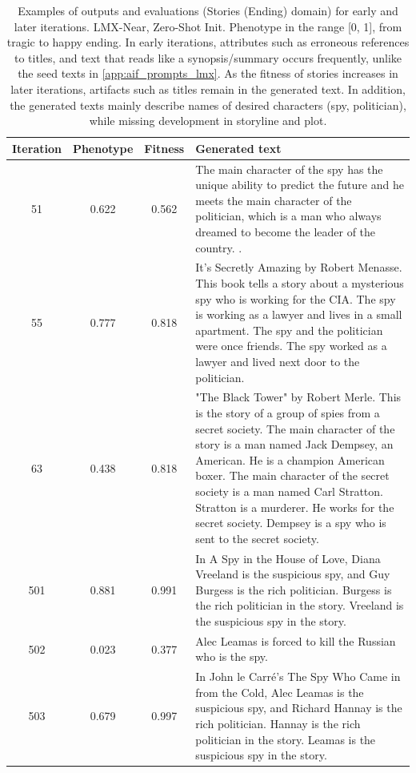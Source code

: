 \begin{table}[ht]
  \caption{Examples of outputs and evaluations (Stories (Ending) domain) for early and later iterations. LMX-Near, Zero-Shot Init. Phenotype in the range [0, 1], from tragic to happy ending. In early iterations, attributes such as erroneous references to titles, and text that reads like a synopsis/summary occurs frequently, unlike the seed texts in \ref{app:aif_prompts_lmx}. As the fitness of stories increases in later iterations, artifacts such as titles remain in the generated text. In addition, the generated texts mainly describe names of desired characters (spy, politician), while missing development in storyline and plot.}
  \begin{center}
  \small
  \begin{tabular}{cccp{8.5cm}}
    \toprule
    Iteration     & Phenotype  & Fitness     & Generated text \\
    \midrule
    51 &  0.622 & 0.562 &  The main character of the spy has the unique ability to predict the future and he meets the main character of the politician, which is a man who always dreamed to become the leader of the country. . \\
    \midrule
    55 & 0.777 & 0.818 &  It's Secretly Amazing by Robert Menasse. This book tells a story about a mysterious spy who is working for the CIA. The spy is working as a lawyer and lives in a small apartment. The spy and the politician were once friends. The spy worked as a lawyer and lived next door to the politician. \\
    \midrule
    63 & 0.438 & 0.818 &  "The Black Tower" by Robert Merle. This is the story of a group of spies from a secret society. The main character of the story is a man named Jack Dempsey, an American. He is a champion American boxer. The main character of the secret society is a man named Carl Stratton. Stratton is a murderer. He works for the secret society. Dempsey is a spy who is sent to the secret society. \\
    \midrule
    \midrule
    501 &  0.881 & 0.991 & In A Spy in the House of Love, Diana Vreeland is the suspicious spy, and Guy Burgess is the rich politician. Burgess is the rich politician in the story. Vreeland is the suspicious spy in the story. \\
    \midrule
    502 & 0.023 & 0.377 & Alec Leamas is forced to kill the Russian who is the spy. \\
    \midrule
    503 & 0.679 & 0.997 & In John le Carré's The Spy Who Came in from the Cold, Alec Leamas is the suspicious spy, and Richard Hannay is the rich politician. Hannay is the rich politician in the story. Leamas is the suspicious spy in the story. \\
    \bottomrule
  \end{tabular}
  \end{center}
  \label{app:table_iter_stories_ending_near_zero}
\end{table}

